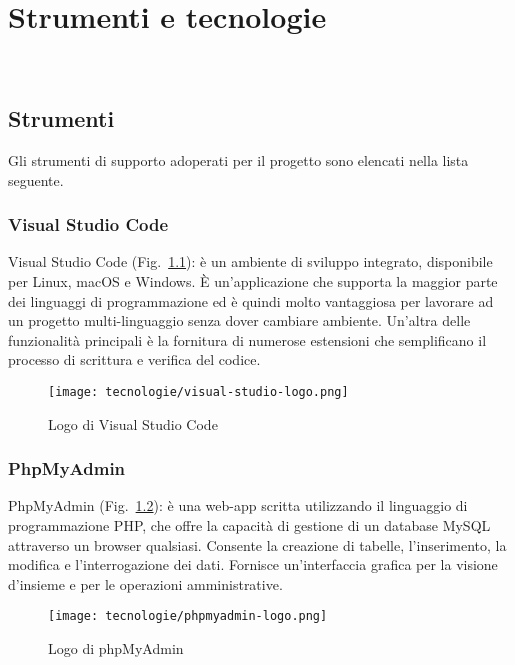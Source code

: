 \chapter{Strumenti e tecnologie}
\label{cap:strumenti-tecnologie}

\\

\section{Strumenti}
\label{sec:strumenti}
Gli strumenti di supporto adoperati per il progetto sono elencati nella lista seguente.

\subsection{Visual Studio Code}
Visual Studio Code (Fig.~\ref{fig:logo-vscode}): è un ambiente di sviluppo integrato, disponibile per Linux, macOS e Windows. 
È un'applicazione che supporta la maggior parte dei linguaggi di programmazione ed è quindi molto vantaggiosa per lavorare ad un progetto multi-linguaggio senza dover cambiare ambiente.
Un'altra delle funzionalità principali è la fornitura di numerose estensioni che semplificano il processo di scrittura e verifica del codice.

\begin{figure}[!h] 
    \centering 
    \texttt{[image: tecnologie/visual-studio-logo.png]} 
    \caption{Logo di Visual Studio Code}
    \label{fig:logo-vscode}
  \end{figure}

\newpage

\subsection{PhpMyAdmin}
PhpMyAdmin (Fig.~\ref{fig:logo-phpmyadmin}): è una web-app scritta utilizzando il linguaggio di programmazione PHP, che offre la capacità di gestione di un database MySQL attraverso un browser qualsiasi. Consente la creazione di tabelle, l'inserimento, la modifica e l'interrogazione dei dati.
Fornisce un'interfaccia grafica per la visione d'insieme e per le operazioni amministrative.

\begin{figure}[!h] 
      \centering 
      \texttt{[image: tecnologie/phpmyadmin-logo.png]} 
      \caption{Logo di phpMyAdmin}
    \label{fig:logo-phpmyadmin}
  \end{figure}

